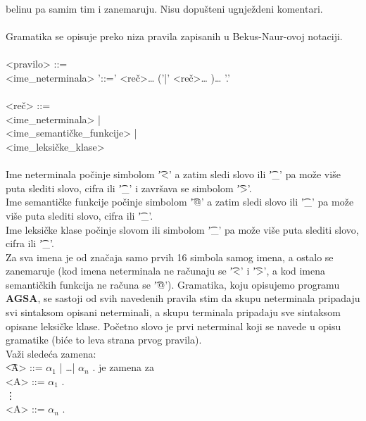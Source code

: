       belinu pa samim tim i zanemaruju.
      Nisu dopu\v steni ugnje\v zdeni kome\-ntari.\\
      \\
      Gramatika se opisuje preko niza pravila zapisanih u Bekus-Naur-ovoj
      notaciji.\\
      \\
      \t
      {
        <pravilo> ::=\\
        \hs<ime\_neterminala> '::=' <re\v c>{\ldots} ('|' <re\v c>{\ldots} ){\ldots} '.'\\
        \\
        <re\v c> ::=\\
        \hs<ime\_neterminala> |\\
        \hs<ime\_semanti\v cke\_funkcije> |\\
        \hs<ime\_leksi\v cke\_klase>\\
      }\\
      Ime neterminala po\v cinje simbolom \t{'<'} a zatim sledi slovo ili
      \t{'\_'} pa mo\v ze vi\v se puta slediti slovo, cifra ili \t{'\_'}
      i zavr\v sava se simbolom \t{'>'}.\\
      Ime semanti\v cke funkcije po\v cinje simbolom \t{'@'} a zatim sledi
      slovo ili \t{'\_'} pa mo\v ze vi\v se puta slediti slovo, cifra
      ili \t{'\_'}.\\
      Ime leksi\v cke klase po\v cinje slovom ili simbolom \t{'\_'} pa
      mo\v ze vi\v se puta slediti slovo, cifra ili \t{'\_'}.\\
      Za sva imena je od zna\v caja samo prvih 16 simbola samog imena, a
      ostalo se zanemaruje (kod imena neterminala ne ra\v cunaju se
      \t{'<'} i \t{'>'}, a kod imena semanti\v ckih funkcija ne ra\v cuna
      se \t{'@'}).
%
%
      Gramatika, koju opisujemo programu {\bf AGSA}, se sastoji od svih
      navedenih pravila stim da skupu neterminala pripadaju svi sintaksom
      opisani neterminali, a skupu terminala pripadaju sve sintaksom
      opisane leksi\v cke klase.
      Po\v cetno slovo je prvi neterminal koji se navede u opisu gramatike
      (bi\'ce to leva strana prvog pravila).\\
      Va\v zi slede\'ca zamena:\\
      \t{<A> ::= $\alpha_{1}$ | \ldots | $\alpha_{n}$ .}
      je zamena za\\
      \t
      {
        <A> ::= $\alpha_{1}$ .\\
        \vdots\\
        <A> ::= $\alpha_{n}$ .\\
      }\\
